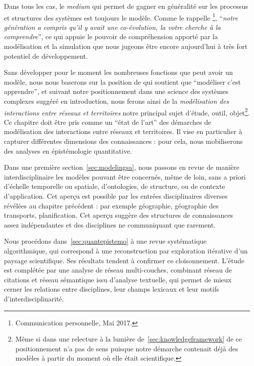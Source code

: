 Dans tous les cas, le \emph{medium} qui permet de gagner en généralité sur les processus et structures des systèmes est toujours le modèle. Comme le rappelle \footnote{Communication personnelle, Mai 2017.}, ``\textit{notre génération a compris qu'il y avait une co-évolution, la votre cherche à la comprendre}'', ce qui appuie le pouvoir de compréhension apporté par la modélisation et la simulation que nous jugeons être encore aujourd'hui à très fort potentiel de développement.

Sans développer pour le moment les nombreuses fonctions que peut avoir un modèle, nous nous baserons sur la position de  qui soutient que ``modéliser c'est apprendre'', et suivant notre positionnement dans une science des systèmes complexes suggéré en introduction, nous ferons ainsi de la \emph{modélisation des interactions entre réseaux et territoires} notre principal sujet d'étude, outil, objet\footnote{Même si dans une relecture à la lumière de~\ref{sec:knowledgeframework} de ce positionnement n'a pas de sens puisque notre démarche contenait déjà des modèles à partir du moment où elle était scientifique.}. Ce chapitre doit être pris comme un ``état de l'art'' des démarches de modélisation des interactions entre réseaux et territoires. Il vise en particulier à capturer différentes dimensions des connaissances : pour cela, nous mobiliserons des analyses en épistémologie quantitative.


Dans une première section~\ref{sec:modelingsa}, nous passons en revue de manière interdisciplinaire les modèles pouvant être concernés, même de loin, sans a priori d'échelle temporelle ou spatiale, d'ontologies, de structure, ou de contexte d'application. Cet aperçu est possible par les entrées disciplinaires diverses révélées au chapitre précédent : par exemple géographie, géographie des transports, planification. Cet aperçu suggère des structures de connaissances assez indépendantes et des disciplines ne communiquant que rarement.

Nous procédons dans~\ref{sec:quantepistemo} à une revue systématique algorithmique, qui correspond à une reconstruction par exploration itérative d'un paysage scientifique. Ses résultats tendent à confirmer ce cloisonnement. L'étude est complétée par une analyse de réseau multi-couches, combinant réseau de citations et réseau sémantique issu d'analyse textuelle, qui permet de mieux cerner les relations entre disciplines, leur champs lexicaux et leur motifs d'interdisciplinarité.


